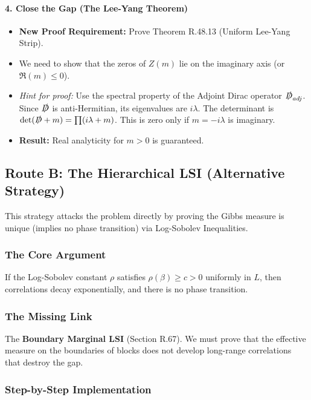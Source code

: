 \paragraph{4. Close the Gap (The Lee-Yang Theorem)}
\begin{itemize}
    \item \textbf{New Proof Requirement:} Prove Theorem R.48.13 (Uniform Lee-Yang Strip).
    \item We need to show that the zeros of $Z(m)$ lie on the imaginary axis (or $\Re(m) \le 0$).
    \item \textit{Hint for proof:} Use the spectral property of the Adjoint Dirac operator $\slashed{D}_{adj}$. Since $\slashed{D}$ is anti-Hermitian, its eigenvalues are $i\lambda$. The determinant is $\det(\slashed{D} + m) = \prod (i\lambda + m)$. This is zero only if $m = -i\lambda$ is imaginary.
    \item \textbf{Result:} Real analyticity for $m > 0$ is guaranteed.
\end{itemize}

\subsection{Route B: The Hierarchical LSI (Alternative Strategy)}
\label{sec:route-b-lsi}

This strategy attacks the problem directly by proving the Gibbs measure is unique (implies no phase transition) via Log-Sobolev Inequalities.

\subsubsection{The Core Argument}
If the Log-Sobolev constant $\rho$ satisfies $\rho(\beta) \ge c > 0$ uniformly in $L$, then correlations decay exponentially, and there is no phase transition.

\subsubsection{The Missing Link}
The \textbf{Boundary Marginal LSI} (Section R.67). We must prove that the effective measure on the boundaries of blocks does not develop long-range correlations that destroy the gap.

\subsubsection{Step-by-Step Implementation}

